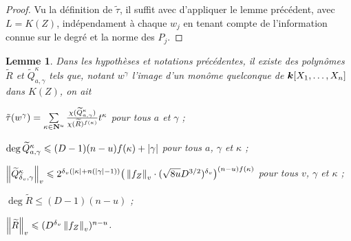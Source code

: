 \documentclass[11pt, twoside, a4paper]{article}
\newtheorem{lem}[thm]{Lemme} \newtheorem{coro}[thm]{Corollaire}
\theoremstyle{definition}
\begin{document}
\begin{proof}
  Vu la définition de $\tilde\tau$, il suffit avec d'appliquer le lemme
  précédent, avec $L = K(Z)$, indépendament à chaque $w_j$ en tenant compte de
  l'information connue sur le degré et la norme des $P_j$.
\end{proof}

\begin{lem}
  Dans les hypothèses et notations précédentes, il existe des polynômes
  $\widetilde R$ et $\widetilde Q_{a, \gamma}^\kappa$ tels que, notant
  $w^\gamma$ l'image d'un monôme quelconque de $\boldsymbol{k}[X_1, \ldots, X_n]$ dans
  $K(Z)$, on ait
  \begin{enumthm}
    \item $\tilde\tau(w^\gamma) = \sum\limits_{\kappa\in\mathbf{N}^u}
      \frac
        {\chi(\widetilde Q_{a, \gamma}^\kappa)}
        {\chi(\widetilde R)^{f(\kappa)}}
      t^\kappa$ pour tous $a$ et $\gamma$ ;
    \item $\deg \widetilde Q_{a, \gamma}^\kappa \leqslant (D-1)(n-u)f(\kappa) +
      {\lvert\gamma\rvert}$ pour tous $a$, $\gamma$ et $\kappa$ ;
    \item $\left\lVert\widetilde Q_{{\delta\smash{_v}}, \gamma}^\kappa\right\rVert_{v} \leqslant 2^{{\delta\smash{_v}}({\lvert\kappa\rvert} +
        n({\lvert\gamma\rvert} -1))} \big( \left\lVert f_Z\right\rVert_{v} \cdot (\sqrt{8u} D^{3/2})^{\delta\smash{_v}}
      \big)^{(n-u)f(\kappa)}$ pour tous $v$, $\gamma$ et $\kappa$ ;
    \item $\deg{\widetilde R} \le (D-1)(n-u)$ ;
    \item $\left\lVert\widetilde R\right\rVert_{v} \leqslant (D^{\delta\smash{_v}} \left\lVert f_Z\right\rVert_{v})^{n-u}$.
  \end{enumthm}
\end{lem}
\end{document}
